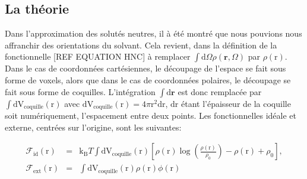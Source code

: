 







\subsection{La théorie}
Dans l'approximation des solutés neutres, il à été montré que nous pouvions nous affranchir des orientations du solvant. Cela revient, dans la définition de la fonctionnelle [REF EQUATION HNC] à remplacer $\int\mathrm{d}\Omega\rho(\boldsymbol{r}, \Omega)$ par $\rho(\mathrm{r})$. Dans le cas de coordonnées cartésiennes, le découpage de l'espace se fait sous forme de voxels, alors que dans le cas de coordonnées polaires, le découpage se fait sous forme de coquilles. L'intégration $\int\mathrm{d}\boldsymbol{r}$ est donc remplacée par $\int\mathrm{dV}_{\mathrm{coquille}}(\mathrm{r})$ avec $\mathrm{dV}_{\mathrm{coquille}}(\mathrm{r})=4 \pi \mathrm{r}^2 \mathrm{dr}$, $\mathrm{dr}$ étant l'épaisseur de la coquille soit numériquement, l'espacement entre deux points. Les fonctionnelles idéale et externe, centrées sur l'origine, sont les suivantes:

\begin{eqnarray}
\mathcal{F}_\mathrm{id}(\mathrm{r})&=&\mathrm{k_B}T\int\mathrm{dV}_{\mathrm{coquille}}(\mathrm{r}) [ \rho\left(\mathrm{r} \right)\log\left(\frac{\rho\left(\mathrm{r} \right)}{\rho_0}\right)-\rho\left(\mathrm{r} \right)+\rho_0 ],\\
\mathcal{F}_\mathrm{ext}(\mathrm{r})&=&\int\mathrm{ dV}_{\mathrm{coquille}}(\mathrm{r})\rho\left(\mathrm{r} \right)\phi\left(\mathrm{r} \right)\\
\end{eqnarray}

